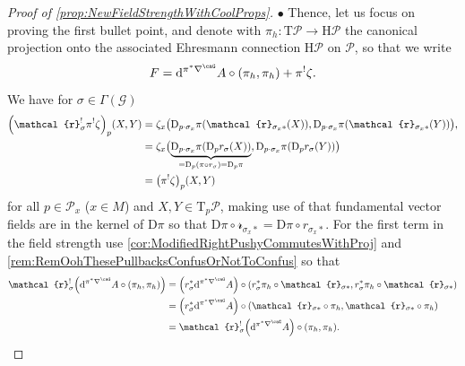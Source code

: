 \documentclass[reqno,a4paper,oneside]{amsart}
\theoremstyle{plain}
\theoremstyle{remark}
\theoremstyle{definition}
\begin{document}
\begin{proof}[Proof of \ref{prop:NewFieldStrengthWithCoolProps}]
$\bullet$ Thence, let us focus on proving the first bullet point, and denote with $\pi_h\colon \mathrm{T}\mathcal{P} \to \mathrm{H}\mathcal{P}$ the canonical projection onto the associated Ehresmann connection $\mathrm{H}\mathcal{P}$ on $\mathcal{P}$, so that we write
\begin{equation*}
F
=
\mathrm{d}^{\pi^*\nabla^\caG} A \circ \mleft( \pi_h, \pi_h \mright)
	+ \pi^!\zeta.
\end{equation*}
We have for $\sigma \in \Gamma(\mathcal{G})$
\begin{align*}
\mleft(\mathcal{r}_\sigma^!\pi^!\zeta\mright)_p(X, Y)
&=
\zeta_{x}\bigl(
	\mathrm{D}_{p \cdot \sigma_x}\pi\mleft( \mathcal{r}_{\sigma_x*}(X) \mright),
	\mathrm{D}_{p \cdot \sigma_x}\pi\mleft( \mathcal{r}_{\sigma_x*}(Y) \mright)
\bigr),
\\
&=
\zeta_{x}\bigl(
	{\underbrace{\mathrm{D}_{p \cdot \sigma_x}\pi\mleft( \mathrm{D}_pr_\sigma\mleft( X \mright) \mright)}_{\mathclap{ = \mathrm{D}_p\mleft( \pi \circ r_\sigma \mright) = \mathrm{D}_p\pi }}},
	\mathrm{D}_{p \cdot \sigma_x}\pi\mleft( \mathrm{D}_pr_\sigma\mleft( Y \mright) \mright)
\bigr)
\\
&=
\mleft(\pi^!\zeta\mright)_p(X, Y)
\end{align*}
for all $p \in \mathcal{P}_x$ ($x \in M$) and $X, Y \in \mathrm{T}_p\mathcal{P}$, making use of that fundamental vector fields are in the kernel of $\mathrm{D}\pi$ so that $\mathrm{D}\pi \circ \mathcal{r}_{\sigma_x*} = \mathrm{D}\pi \circ r_{\sigma_x*}$. For the first term in the field strength use \ref{cor:ModifiedRightPushyCommutesWithProj} and \ref{rem:RemOohThesePullbacksConfusOrNotToConfus} so that
\begin{align*}
\mathcal{r}_\sigma^!\mleft(\mathrm{d}^{\pi^*\nabla^\caG} A \circ \mleft( \pi_h, \pi_h \mright)\mright)
&=
\mleft(r_\sigma^*\mathrm{d}^{\pi^*\nabla^\caG} A\mright) \circ \mleft( r_\sigma^*\pi_h \circ \mathcal{r}_{\sigma*}, r_\sigma^*\pi_h \circ \mathcal{r}_{\sigma*} \mright)
\\
&=
\mleft(r_\sigma^*\mathrm{d}^{\pi^*\nabla^\caG} A\mright) \circ \mleft( \mathcal{r}_{\sigma*} \circ \pi_h, \mathcal{r}_{\sigma*} \circ \pi_h \mright)
\\
&=
\mathcal{r}_\sigma^!\mleft(\mathrm{d}^{\pi^*\nabla^\caG} A\mright) \circ (\pi_h, \pi_h).

\end{align*}
\end{proof}
\end{document}
